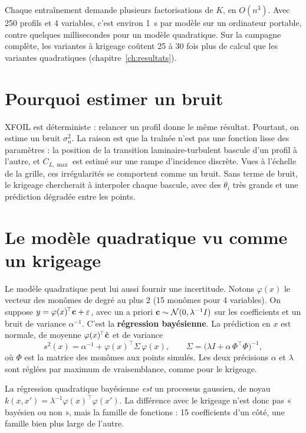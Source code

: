 \begin{piege}
Chaque entraînement demande plusieurs factorisations de $K$, en $O(n^3)$. Avec 250 profils et 4 variables, c'est environ 1~s par modèle sur un ordinateur portable, contre quelques millisecondes pour un modèle quadratique. Sur la campagne complète, les variantes à krigeage coûtent 25 à 30 fois plus de calcul que les variantes quadratiques (chapitre~\ref{ch:resultats}).
\end{piege}

\section{Pourquoi estimer un bruit}
XFOIL est déterministe : relancer un profil donne le même résultat. Pourtant, on estime un bruit $\sigma_n^2$. La raison est que la traînée n'est pas une fonction lisse des paramètres : la position de la transition laminaire-turbulent bascule d'un profil à l'autre, et $C_{L,\max}$ est estimé sur une rampe d'incidence discrète. Vues à l'échelle de la grille, ces irrégularités se comportent comme un bruit. Sans terme de bruit, le krigeage chercherait à interpoler chaque bascule, avec des $\theta_i$ très grands et une prédiction dégradée entre les points.

\section{Le modèle quadratique vu comme un krigeage}
Le modèle quadratique peut lui aussi fournir une incertitude. Notons $\varphi(x)$ le vecteur des monômes de degré au plus 2 (15 monômes pour 4 variables). On suppose $y=\varphi(x)^{\!\top}\mathbf{c}+\varepsilon$, avec un a priori $\mathbf{c}\sim\mathcal N(0,\lambda^{-1}I)$ sur les coefficients et un bruit de variance $\alpha^{-1}$. C'est la \textbf{régression bayésienne}. La prédiction en $x$ est normale, de moyenne $\varphi(x)^{\!\top}\hat{\mathbf{c}}$ et de variance
\[
s^2(x)=\alpha^{-1}+\varphi(x)^{\!\top}\Sigma\,\varphi(x),\qquad \Sigma=\big(\lambda I+\alpha\,\Phi^{\!\top}\Phi\big)^{-1},
\]
où $\Phi$ est la matrice des monômes aux points simulés. Les deux précisions $\alpha$ et $\lambda$ sont réglées par maximum de vraisemblance, comme pour le krigeage.

\begin{resultat}
La régression quadratique bayésienne \emph{est} un processus gaussien, de noyau $k(x,x')=\lambda^{-1}\varphi(x)^{\!\top}\varphi(x')$. La différence avec le krigeage n'est donc pas « bayésien ou non », mais la famille de fonctions : 15 coefficients d'un côté, une famille bien plus large de l'autre.
\end{resultat}

